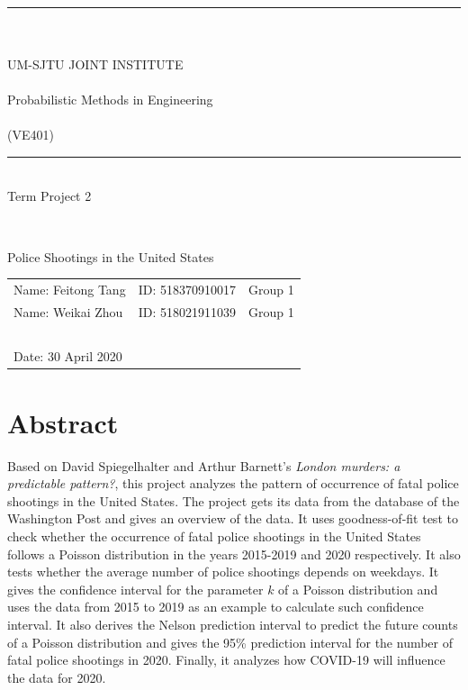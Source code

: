 \documentclass[a4paper]{article}
\begin{document}
\begin{large}
	\begin{center}
	~\\ ~\\ ~\\ ~\\ ~\\ ~\\ \rule[-1pt]{10.3cm}{0.05em} \\~\\UM-SJTU JOINT INSTITUTE\\~\\Probabilistic Methods in
Engineering\\~\\(VE401)	~\\ \rule[-1pt]{10.3cm}{0.05em} \vspace{7cm} \\Term Project 2
	\end{center}
\end{large}
~\\

\begin{large}
	\begin{center}
	Police Shootings in the United States
	\end{center}
\end{large}
\vspace{5cm}

\begin{tabular}{l l l}
	Name: Feitong Tang&ID: 518370910017&Group 1\\
	Name: Weikai Zhou&ID: 518021911039&Group 1\\
     ~\\
	Date: 30 April 2020
\end{tabular}

\newpage












\section{Abstract}
	Based on David Spiegelhalter and Arthur Barnett's \textit{London murders: a predictable pattern?}, this project analyzes the pattern of occurrence of fatal police shootings in the United States. The project gets its data from the database of the Washington Post and gives an overview of the data. It uses goodness-of-fit test to check whether the occurrence of fatal police shootings in the United States follows a Poisson distribution in the years 2015-2019 and 2020 respectively. It also tests whether the average number of police shootings depends on weekdays. It gives the confidence interval for the parameter $k$ of a Poisson distribution and uses the data from 2015 to 2019 as an example to calculate such confidence interval. It also derives the Nelson prediction interval to predict the future counts of a Poisson distribution and gives the 95\% prediction interval for the number of fatal police shootings in 2020. Finally, it analyzes how COVID-19 will influence the data for 2020.
\\
\end{document}
